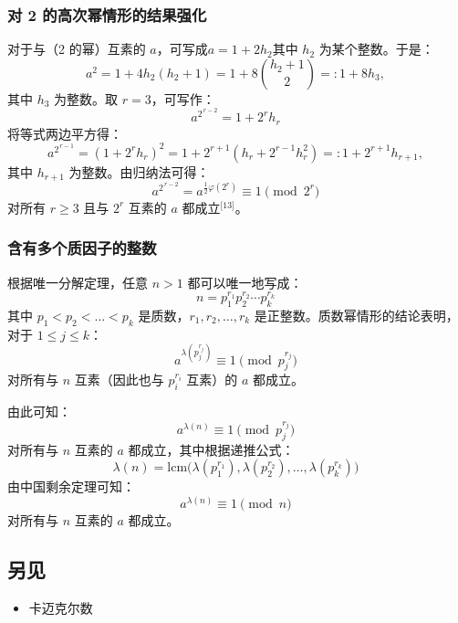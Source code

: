\subsubsection{对 2 的高次幂情形的结果强化}
对于与（2 的幂）互素的 $a$，可写成$a = 1 + 2h_{2}$其中 $h_{2}$ 为某个整数。于是：
$$
a^{2} = 1 + 4h_{2}(h_{2} + 1) = 1 + 8 \binom{h_{2} + 1}{2} =: 1 + 8h_{3},~
$$
其中 $h_{3}$ 为整数。取 $r = 3$，可写作：
$$
a^{2^{\,r-2}} = 1 + 2^{r} h_{r}~
$$
将等式两边平方得：
$$
a^{2^{\,r-1}} = \left( 1 + 2^{r} h_{r} \right)^{2} = 1 + 2^{r+1} \left( h_{r} + 2^{r-1} h_{r}^{2} \right) =: 1 + 2^{r+1} h_{r+1},~
$$
其中 $h_{r+1}$ 为整数。由归纳法可得：
$$
a^{2^{\,r-2}} = a^{\frac12 \varphi(2^{r})} \equiv 1 \pmod{2^{r}}~
$$
对所有 $r \ge 3$ 且与 $2^{r}$ 互素的 $a$ 都成立\(^\text{[13]}\)。
\subsubsection{含有多个质因子的整数}
根据唯一分解定理，任意 $n > 1$ 都可以唯一地写成：
$$
n = p_{1}^{r_{1}} p_{2}^{r_{2}} \cdots p_{k}^{r_{k}}~
$$
其中 $p_{1} < p_{2} < \dots < p_{k}$ 是质数，$r_{1}, r_{2}, \dots, r_{k}$ 是正整数。质数幂情形的结论表明，对于 $1 \le j \le k$：
$$
a^{\lambda\left(p_{j}^{r_{j}}\right)} \equiv 1 \pmod{p_{j}^{r_{j}}}~
$$
对所有与 $n$ 互素（因此也与 $p_{i}^{r_{i}}$ 互素）的 $a$ 都成立。

由此可知：
$$
a^{\lambda(n)} \equiv 1 \pmod{p_{j}^{r_{j}}}~
$$
对所有与 $n$ 互素的 $a$ 都成立，其中根据递推公式：
$$
\lambda(n) = \mathrm{lcm}\bigl(\lambda(p_{1}^{r_{1}}), \lambda(p_{2}^{r_{2}}), \dots, \lambda(p_{k}^{r_{k}})\bigr)~
$$
由中国剩余定理可知：
$$
a^{\lambda(n)} \equiv 1 \pmod{n}~
$$
对所有与 $n$ 互素的 $a$ 都成立。
\subsection{另见}
\begin{itemize}
\item 卡迈克尔数
\end{itemize}
